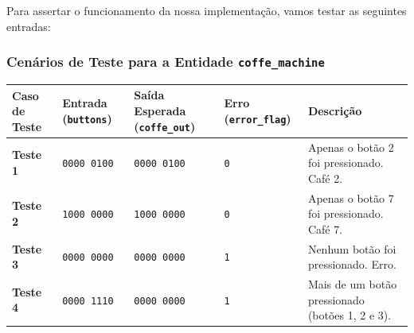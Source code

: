 Para assertar o funcionamento da nossa implementação, vamos testar as
seguintes entradas:

\subsubsection{\texorpdfstring{Cenários de Teste para a Entidade
\texttt{coffe\_machine}}{Cenários de Teste para a Entidade coffe\_machine}}\label{cenuxe1rios-de-teste-para-a-entidade-coffe_machine}

\begin{longtable}[]{@{}
  >{\raggedright\arraybackslash}p{}
  >{\raggedright\arraybackslash}p{}
  >{\raggedright\arraybackslash}p{}
  >{\raggedright\arraybackslash}p{}
  >{\raggedright\arraybackslash}p{}@{}}
\toprule\noalign{}
\begin{minipage}[b]{\linewidth}\raggedright
\textbf{Caso de Teste}
\end{minipage} & \begin{minipage}[b]{\linewidth}\raggedright
\textbf{Entrada (\texttt{buttons})}
\end{minipage} & \begin{minipage}[b]{\linewidth}\raggedright
\textbf{Saída Esperada (\texttt{coffe\_out})}
\end{minipage} & \begin{minipage}[b]{\linewidth}\raggedright
\textbf{Erro (\texttt{error\_flag})}
\end{minipage} & \begin{minipage}[b]{\linewidth}\raggedright
\textbf{Descrição}
\end{minipage} \\
\midrule\noalign{}
\endhead
\bottomrule\noalign{}
\endlastfoot
\textbf{Teste 1} & \texttt{0000\ 0100} & \texttt{0000\ 0100} &
\texttt{0} & Apenas o botão 2 foi pressionado. Café 2. \\
\textbf{Teste 2} & \texttt{1000\ 0000} & \texttt{1000\ 0000} &
\texttt{0} & Apenas o botão 7 foi pressionado. Café 7. \\
\textbf{Teste 3} & \texttt{0000\ 0000} & \texttt{0000\ 0000} &
\texttt{1} & Nenhum botão foi pressionado. Erro. \\
\textbf{Teste 4} & \texttt{0000\ 1110} & \texttt{0000\ 0000} &
\texttt{1} & Mais de um botão pressionado (botões 1, 2 e 3). \\
\end{longtable}
